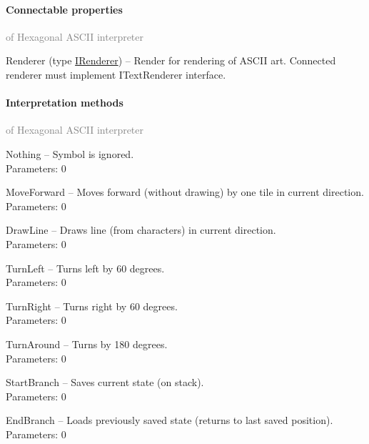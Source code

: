 	\paragraph{Connectable properties}\textcolor{gray}{of Hexagonal ASCII interpreter}
	\begin{description*}
		\item[Renderer]
		(type \hyperref[Malsys.Processing.Components.IRenderer]{IRenderer})
			-- Render for rendering of ASCII art.
            Connected renderer must implement ITextRenderer interface.
	\end{description*}
	\paragraph{Interpretation methods}\textcolor{gray}{of Hexagonal ASCII interpreter}
	\begin{description*}
		\item[Nothing]
			-- Symbol is ignored.
		\\ Parameters: 0 
		\item[MoveForward]
			-- Moves forward (without drawing) by one tile in current direction.
		\\ Parameters: 0 
		\item[DrawLine]
			-- Draws line (from characters) in current direction.
		\\ Parameters: 0 
		\item[TurnLeft]
			-- Turns left by 60 degrees.
		\\ Parameters: 0 
		\item[TurnRight]
			-- Turns right by 60 degrees.
		\\ Parameters: 0 
		\item[TurnAround]
			-- Turns by 180 degrees.
		\\ Parameters: 0 
		\item[StartBranch]
			-- Saves current state (on stack).
		\\ Parameters: 0 
		\item[EndBranch]
			-- Loads previously saved state (returns to last saved position).
		\\ Parameters: 0 
	\end{description*}
	

